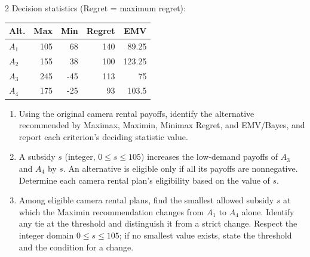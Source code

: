 \begin{multicols}{2}
\columnbreak
Decision statistics (Regret = maximum regret):

\vspace{-3mm}
\begin{center}\small\setlength{\tabcolsep}{4pt}
	\begin{tabular}{lrrrr}\toprule
		Alt. & Max & Min & Regret & EMV\\ \midrule
				$A_1$ & 105 & 68 & 140 & 89.25\\
		$A_2$ & 155 & 38 & 100 & 123.25\\
		$A_3$ & 245 & -45 & 113 & 75\\
		$A_4$ & 175 & -25 & 93 & 103.5\\
		\bottomrule
	\end{tabular}
\end{center}
\vspace{-3mm}

\begin{enumerate}[label=\textbf{(\alph*)},leftmargin=*]
	\item Using the original camera rental payoffs, identify the alternative recommended by Maximax, Maximin, Minimax Regret, and EMV/Bayes, and report each criterion's deciding statistic value. 

	\item A subsidy $s$ (integer, $0\leq s\leq105$) increases the low-demand payoffs of $A_3$ and $A_4$ by $s$. An alternative is eligible only if all its payoffs are nonnegative. Determine each camera rental plan's eligibility based on the value of $s$. 

	\item Among eligible camera rental plans, find the smallest allowed subsidy $s$ at which the Maximin recommendation changes from $A_1$ to $A_4$ alone. Identify any tie at the threshold and distinguish it from a strict change. Respect the integer domain $0\leq s\leq105$; if no smallest value exists, state the threshold and the condition for a change. 
\end{enumerate}


\end{multicols}
\newpage

